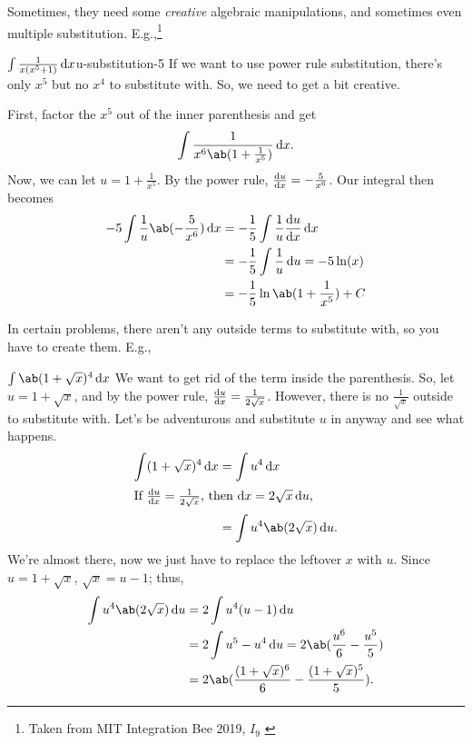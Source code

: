 Sometimes, they need some \emph{creative} algebraic manipulations, and sometimes even multiple substitution. E.g.,\footnote{Taken from MIT Integration Bee 2019, $I_9$ \cite{alkousa-2023}}
\begin{exmp}{$\int \frac{1}{x(x^5 + 1)}\odif{x}$}{u-substitution-5}
  If we want to use power rule substitution, there's only $x^5$ but no $x^4$ to substitute with. So, we need to get a bit creative.
  
  First, factor the $x^5$ out of the inner parenthesis and get
  \begin{equation}
    \int\frac{1}{x^6\ab(1 + \frac{1}{x^5})}\odif{x}.
  \end{equation}
  Now, we can let $u = 1 + \frac{1}{x^5}$. By the power rule, $\odv{u}{x} = -\frac{5}{x^6}$. Our integral then becomes
  \begin{align}
    -5\int\frac{1}{u}\ab(-\frac{5}{x^6})\odif{x} & = -\frac{1}{5}\int\frac{1}{u}\odv{u}{x}\odif{x}  \\
                                                 & = -\frac{1}{5}\int\frac{1}{u}\odif{u} = -5\ln(x) \\
                                                 & = -\frac{1}{5}\ln\ab(1 + \frac{1}{x^5}) + C
  \end{align}
\end{exmp}

In certain problems, there aren't any outside terms to substitute with, so you have to create them. E.g.,
\begin{exmp}{$\int\ab(1 + \sqrt{x})^4\odif{x}$}{}
  We want to get rid of the term inside the parenthesis. So, let $u = 1 + \sqrt{x}$, and by the power rule, $\odv{u}{x} = \frac{1}{2\sqrt{x}}$. However, there is no $\frac{1}{\sqrt{x}}$ outside to substitute with. Let's be adventurous and substitute $u$ in anyway and see what happens.
  \begin{align}
    \int(1 + \sqrt{x})^4\odif{x} & = \int u^4\odif{x}                 \\
    \intertext{If $\odv{u}{x} = \frac{1}{2\sqrt{x}}$, then $\odif{x} = 2\sqrt{x}\odif{u}$,}
                                 & = \int u^4\ab(2\sqrt{x})\odif{u}.
  \end{align}
  We're almost there, now we just have to replace the leftover $x$ with $u$. Since $u = 1 + \sqrt{x}$, $\sqrt{x} = u - 1$; thus,
  \begin{align}
    \int u^4\ab(2\sqrt{x})\odif{u} & = 2\int u^4(u - 1)\odif{u}                                        \\
                                   & = 2\int u^5 - u^4\odif{u} = 2\ab(\frac{u^6}{6} - \frac{u^5}{5})   \\
                                   & = 2\ab(\frac{(1 + \sqrt{x})^6}{6} - \frac{(1 + \sqrt{x})^5}{5}).
  \end{align}
\end{exmp}

